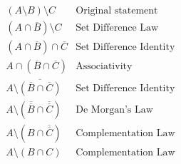 \documentclass{article}
\begin{document}
\section{}
\begin{align*}
    & (A \setminus B ) \setminus C & \text{Original statement} & \\
    & (A \cap \overline{B} ) \setminus C & \text{Set Difference Law} & \\
    & (A \cap \overline{B} ) \cap \overline{C} & \text{Set Difference Identity} & \\
    & A \cap (\overline{B}  \cap \overline{C}) & \text{Associativity} & \\
    & A \setminus \overline{(\overline{B}  \cap \overline{C})} & \text{Set Difference Identity} & \\
    & A \setminus (\overline{\overline{B}}  \cap \overline{\overline{C}}) & \text{De Morgan's Law} & \\
    & A \setminus (B  \cap \overline{\overline{C}}) & \text{Complementation Law} & \\
    & A \setminus (B  \cap C) & \text{Complementation Law} &
\end{align*}
\end{document}
